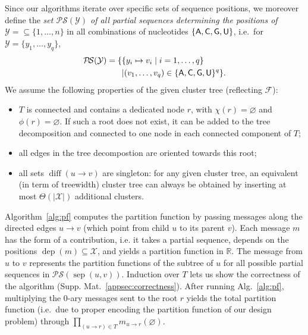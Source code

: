 \documentclass[]{bmcart}
\newcommand{\dep}{\operatorname{dep}}
\newcommand{\separator}[2]{\operatorname{sep}(#1,#2)}
\newcommand{\difference}[2]{\operatorname{diff}(#1 \rightarrow #2)}
\newcommand{\real}{\mathbb{R}}
\newcommand{\Message}[2]{m_{#1\rightarrow #2}}
\newcommand{\partseqs}{\mathcal{P\!S}}
\newcommand{\F}{\mathcal{F}}
\newcommand{\X}{\mathcal{X}}
\newcommand{\Y}{\mathcal{Y}}
\newcommand{\Def}[1]{\emph{#1}}
\newcommand{\Nuc}[1]{{\sf #1}}
\newcommand{\Ab}{\Nuc{A}}
\newcommand{\Cb}{\Nuc{C}}
\newcommand{\Gb}{\Nuc{G}}
\newcommand{\Ub}{\Nuc{U}}
\newcommand{\evalfor}[2]{#1(#2)}
\begin{document}
Since our algorithms iterate over specific sets of sequence positions, we moreover define
the \Def{set $\partseqs(\Y)$ of all partial sequences determining the positions of $\Y=\subseteq\{1,\dots,n\}$} in all combinations of nucleotides $\{\Ab,\Cb,\Gb,\Ub\}$,
i.e.~for $\Y=\{y_1,\dots,y_{q}\}$,
\begin{align*}
\partseqs(\Y) = \{ & \{ y_i\mapsto v_i \mid i=1,\dots,q \} \\& | (v_1,\dots,v_{q}) \in \{\Ab,\Cb,\Gb,\Ub\}^{q} \}.
\end{align*}
%
We assume the following properties of the given cluster tree (reflecting $\F$):
\begin{itemize}
\item
$T$ is
connected and contains a dedicated node $r$, with
$\chi(r)=\varnothing$ and $\phi(r)=\varnothing$. If such a root does not exist, it can be added to the tree decomposition and connected to one node in each connected component of $T$;
\item
all edges in the tree decompostion are oriented towards this root;
\item
all sets $\difference{u}{v}$ are singleton: for any given
cluster tree, an equivalent (in term of treewidth) cluster tree can
always be obtained by inserting at most $\Theta(|\X|)$ additional
clusters.
\end{itemize}

Algorithm~\ref{alg:pf} computes the partition function by passing
messages along the directed edges $u\to v$ (which point from 
child $u$ to its parent $v$). Each message $m$ has the form of a contribution, i.e. it takes a partial sequence, depends
on the positions $\dep(m)\subseteq \X$, and yields a partition function
in $\real$. The message from $u$ to $v$ represents the
partition functions of the subtree of $u$ for all possible partial
sequences in $\partseqs(\separator{u}{v})$. Induction over $T$ lets us show
the correctness of the algorithm
(Supp. Mat.~\ref{appsec:correctness}).  After running
Alg.~\ref{alg:pf}, multiplying the 0-ary messages sent to the root $r$
yields the total partition function (i.e.~due to proper encoding the partition function of our design problem) through
\begin{math}
  \prod_{(u\to{}r)\in T} \evalfor{\Message{u}{r}}{\varnothing}.
\end{math}
\end{document}
